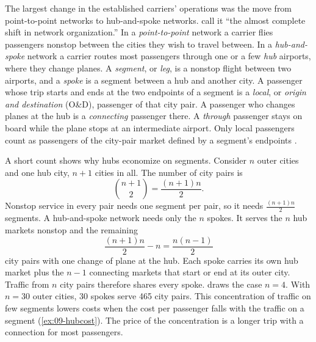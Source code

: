 The largest change in the established carriers' operations was the move from point-to-point networks to
hub-and-spoke networks. \citet[p.~1]{BerryCarnallSpiller2006} call it ``the almost complete shift in network
organization.'' In a \emph{point-to-point} network a carrier flies passengers nonstop between the cities they
wish to travel between. In a \emph{hub-and-spoke} network a carrier routes most passengers through one or a
few \emph{hub} airports, where they change planes. A \emph{segment}, or \emph{leg}, is a nonstop flight
between two airports, and a \emph{spoke} is a segment between a hub and another city. A passenger whose trip
starts and ends at the two endpoints of a segment is a \emph{local}, or \emph{origin and destination} (O\&D),
passenger of that city pair. A passenger who changes planes at the hub is a \emph{connecting} passenger there.
A \emph{through} passenger stays on board while the plane stops at an intermediate airport. Only local
passengers count as passengers of the city-pair market defined by a segment's endpoints
\citep[p.~349, n.~21]{Borenstein1989}.

A short count shows why hubs economize on segments. Consider $n$ outer cities and one hub city, $n+1$ cities
in all. The number of city pairs is
\begin{equation}\label{eq:09-citypairs}
  \binom{n+1}{2} = \frac{(n+1)n}{2}.
\end{equation}
Nonstop service in every pair needs one segment per pair, so it needs $\frac{(n+1)n}{2}$ segments. A
hub-and-spoke network needs only the $n$ spokes. It serves the $n$ hub markets nonstop and the remaining
\begin{equation*}
  \frac{(n+1)n}{2} - n = \frac{n(n-1)}{2}
\end{equation*}
city pairs with one change of plane at the hub. Each spoke carries its own hub market plus the $n-1$
connecting markets that start or end at its outer city. Traffic from $n$ city pairs therefore shares every
spoke.  draws the case $n=4$. With $n=30$ outer cities, 30 spokes serve 465 city pairs.
This concentration of traffic on few segments lowers costs when the cost per passenger falls with the traffic
on a segment (\cref{ex:09-hubcost}). The price of the concentration is a longer trip with a connection for
most passengers.


